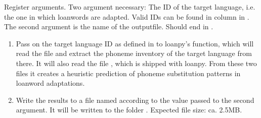 \documentclass[letterpaper,10pt,english]{sphinxmanual}
\begin{document}
\begin{fulllineitems}
\label{\detokenize{mkloanpy:ronataswestoldturkiccommands.makeheur.register}}
\pysigstartsignatures
{}
\pysigstopsignatures
\sphinxAtStartPar
Register arguments. Two argument necessary: The ID of the target language,
i.e. the one in which loanwords are adapted. Valid IDs can be found in
column  in . The second argument is the name of
the output\sphinxhyphen{}file. Should end in .

\end{fulllineitems}


\begin{fulllineitems}
\label{\detokenize{mkloanpy:ronataswestoldturkiccommands.makeheur.run}}
\pysigstartsignatures
{}
\pysigstopsignatures\begin{enumerate}
%
\item {} 
\sphinxAtStartPar
Pass on the target language ID as defined in 
to loanpy’s 
function,
which will read the  file and
extract the phoneme inventory of the target language from there.
It will also read the file , which is shipped with
loanpy. From these two files it creates a heuristic prediction of
phoneme substitution patterns in loanword adaptations.

\item {} 
\sphinxAtStartPar
Write the results to a file named according to the value passed to the
second argument. It will be written to the folder .
Expected file size: ca. 2.5MB.

\end{enumerate}

\end{fulllineitems}
\end{document}
